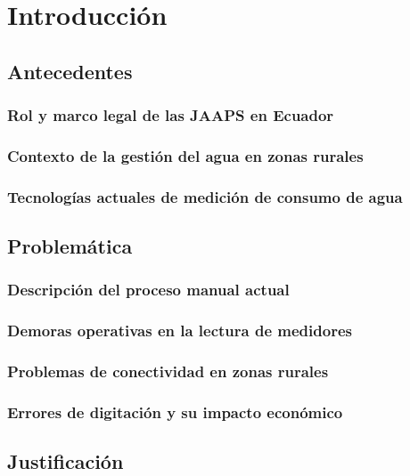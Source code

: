 \chapter{Introducción}

\section{Antecedentes}

\subsection{Rol y marco legal de las JAAPS en Ecuador}


\subsection{Contexto de la gestión del agua en zonas rurales}


\subsection{Tecnologías actuales de medición de consumo de agua}


\section{Problemática}


\subsection{Descripción del proceso manual actual}


\subsection{Demoras operativas en la lectura de medidores}


\subsection{Problemas de conectividad en zonas rurales}


\subsection{Errores de digitación y su impacto económico}


\section{Justificación}

